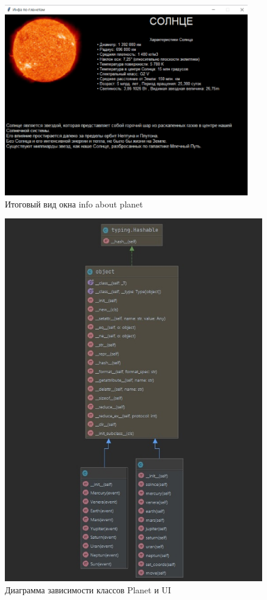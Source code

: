 \documentclass[11pt,a4paper]{report}
\begin{document}
\begin{figure}[h]
\centering
\includegraphics[width=0.78\linewidth]{2.png}
\caption{Итоговый вид окна info about planet}
\label{fig:mpr}

\end{figure}
\begin{figure}[h]
\centering
\includegraphics[width=1.0\linewidth]{otchet.jpg}
\caption{Диаграмма зависимости классов Planet и UI}
\label{fig:mpr}
\end{figure}
\end{document}
